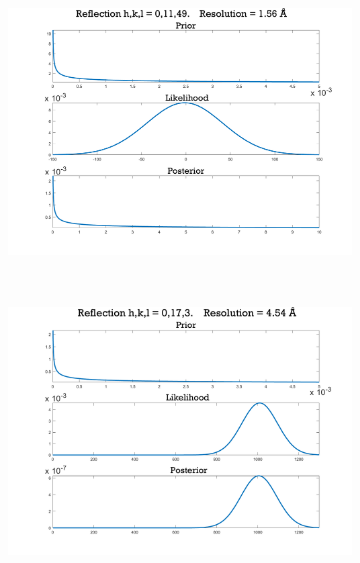 \begin{figure}
        \centering
        \begin{subfigure}[b]{0.94\textwidth}
                \centering
                \includegraphics[width=\textwidth]{figures/zde/distributions_0,11,49.pdf}
                \caption{}
                \label{fig:Weak negative reflection intensity - Extrapolation method}
        \end{subfigure}
				\\
        \begin{subfigure}[b]{0.94\textwidth}
                \centering
                \includegraphics[width=\textwidth]{figures/zde/distributions_0,17,3.pdf}
                \caption{}
                \label{fig:Strong positive reflection intensity - Extrapolation method}

\end{subfigure}
\end{figure}
